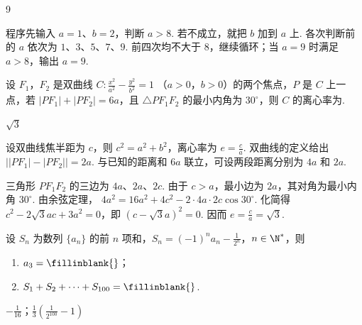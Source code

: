 \begin{answer}
9
\end{answer}

\begin{solution}
程序先输入 \(a=1\)、\(b=2\)，判断 \(a>8\). 若不成立，就把 \(b\) 加到 \(a\) 上. 各次判断前的 \(a\) 依次为 \(1\)、\(3\)、\(5\)、\(7\)、\(9\). 前四次均不大于 \(8\)，继续循环；当 \(a=9\) 时满足 \(a>8\)，输出 \(a=9\).
\end{solution}

\begin{problem}
设 \(F_{1}\)，\(F_{2}\) 是双曲线 \(C: \frac{x^{2}}{a^{2}} - \frac{y^{2}}{b^{2}} = 1 \) （\(a > 0\)，\(b > 0\)）的两个焦点，\(P\) 是 \(C\) 上一点，若 \(|PF_{1}| + |PF_{2}| = 6a\)，且 \(\triangle PF_{1}F_{2}\) 的最小内角为 \(30^{\circ}\)，则 \(C\) 的离心率为\fillinblank{}.
\end{problem}

\begin{answer}
\(\sqrt{3}\)
\end{answer}

\begin{solution}
设双曲线焦半距为 \(c\)，则 \(c^{2}=a^{2}+b^{2}\)，离心率为 \(e=\frac{c}{a}\). 双曲线的定义给出 \(\bigl||PF_{1}|-|PF_{2}|\bigr|=2a\). 与已知的距离和 \(6a\) 联立，可设两段距离分别为 \(4a\) 和 \(2a\).

三角形 \(PF_{1}F_{2}\) 的三边为 \(4a\)、\(2a\)、\(2c\). 由于 \(c>a\)，最小边为 \(2a\)，其对角为最小内角 \(30^{\circ}\). 由余弦定理，
\(4a^{2}=16a^{2}+4c^{2}-2\cdot4a\cdot2c\cos30^{\circ}\).
化简得 \(c^{2}-2\sqrt{3}ac+3a^{2}=0\)，即 \((c-\sqrt{3}a)^{2}=0\). 因而 \(e=\frac{c}{a}=\sqrt{3}\).
\end{solution}

\begin{problem}
设 \(S_{n}\) 为数列 \(\{a_{n}\}\) 的前 \(n\) 项和，\(S_{n} = (-1)^{n}a_{n} - \frac{1}{2^{n}}\)，\(n \in \N^{*}\)，则
\begin{enumerate}
\item \(a_{3} =\fillinblank{}\)；
\item \(S_{1} + S_{2} + \dots + S_{100} =\fillinblank{}\).
\end{enumerate}
\end{problem}

\begin{answer}
\(-\frac{1}{16}\)；\(\frac{1}{3}\left(\frac{1}{2^{100}} - 1\right)\)
\end{answer}


